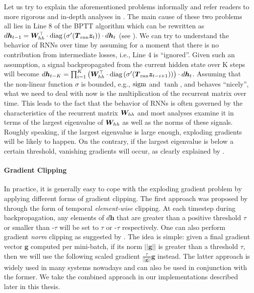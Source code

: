Let us try to explain the aforementioned problems informally and 
refer readers to more rigorous and in-depth analyses in \cite{Bengio-trnn94,lstm97,MartensS11,pascanu13}.
The main cause of these two problems all lies in Line 8 of the BPTT
algorithm which can be rewritten as
$d\bm{h}_{t-1} = \bm{W}_{hh}^\top \cdot \text{diag}\left(\sigma'(\mbox{\boldmath{$T$}}_{\text{rnn}} \bm{z}_{t})\right) \cdot
d\bm{h}_{t}$ (see ). We can try to understand the behavior of RNNs over time by assuming
for a moment that there is no contribution from intermediate losses, i.e., Line 4
is ``ignored''. Given such an assumption, a signal backpropagated from the current hidden state over K
steps will become 
$d\bm{h}_{t-K} = \prod_{i=1}^{K} \left(\bm{W}_{hh}^\top \cdot \text{diag}\left(\sigma'(\mbox{\boldmath{$T$}}_{\text{rnn}}
\bm{z}_{t-i+1})\right)\right) \cdot
d\bm{h}_{t}$. Assuming that the non-linear function $\sigma$ is bounded, e.g.,
$\operatorname{sigm}$ and $\tanh$, and behaves ``nicely'', what we need to deal with now is
the multiplication of the recurrent matrix over time.
This leads to the fact that the behavior of RNNs is often governed by the characteristics of the recurrent matrix
$\bm{W}_{hh}$ and most analyses examine it in terms of the largest eigenvalue of
$\bm{W}_{hh}$ as well as the norms of these signals. Roughly speaking, if the largest eigenvalue
is large enough, exploding gradients will be likely to happen. On the contrary,
if the largest eigenvalue is below a certain threshold, vanishing gradients
will occur, as clearly explained by .

\paragraph{Gradient Clipping} In practice, it is generally easy to cope with the exploding gradient problem by
applying different forms of gradient clipping. The first approach was proposed by
 through the form of temporal {\it element-wise} clipping. At
each timestep during backpropagation, any elements of $d\bm{h}$ that are greater
than a positive threshold $\tau$ or smaller than -$\tau$ will be set
to $\tau$ or -$\tau$ respectively. One can also perform gradient {\it norm}
clipping as suggested by . The idea is simple: given a final
gradient vector $\bm{g}$ computed per mini-batch, if its norm
$||\bm{g}||$ is greater than a threshold
$\tau$, then we will use the following scaled gradient $\frac{\tau}{||\bm{g}||} \bm{g}$
instead. The latter approach is widely used in many systems nowadays and
can also be used in conjunction with the former. We take the combined approach
in our implementations described later in this thesis. 

